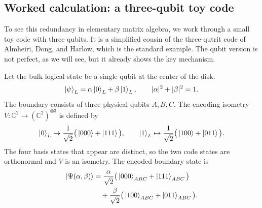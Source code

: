 \subsection*{Worked calculation: a three-qubit toy code}

To see this redundancy in elementary matrix algebra, we work through a small toy code with three qubits. It is
a simplified cousin of the three-qutrit code of Almheiri, Dong, and Harlow, which is the standard example. The
qubit version is not perfect, as we will see, but it already shows the key mechanism.

Let the bulk logical state be a single qubit at the center of the disk:
\[
\ket{\psi}_L = \alpha \ket{0}_L + \beta \ket{1}_L, \qquad |\alpha|^2 + |\beta|^2 = 1 .
\]
The boundary consists of three physical qubits $A, B, C$. The encoding isometry
$V: \mathbb{C}^2 \to (\mathbb{C}^2)^{\otimes 3}$ is defined by
\[
\ket{0}_L \mapsto \frac{1}{\sqrt{2}}\big(\ket{000} + \ket{111}\big), \qquad
\ket{1}_L \mapsto \frac{1}{\sqrt{2}}\big(\ket{100} + \ket{011}\big) .
\]
The four basis states that appear are distinct, so the two code states are orthonormal and $V$ is an
isometry. The encoded boundary state is
\begin{align*}
\ket{\Psi(\alpha,\beta)}
&= \frac{\alpha}{\sqrt{2}}\big(\ket{000}_{ABC} + \ket{111}_{ABC}\big) \\
&\quad + \frac{\beta}{\sqrt{2}}\big(\ket{100}_{ABC} + \ket{011}_{ABC}\big) .
\end{align*}

